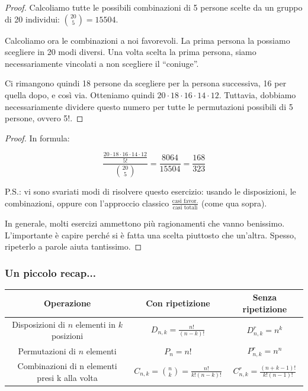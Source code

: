 \documentclass{beamer}
\begin{document}
\begin{frame}

    \begin{proof}\renewcommand{\qedsymbol}{$\longrightarrow$}
	Calcoliamo tutte le possibili combinazioni di 5 persone scelte da un gruppo di 20 individui: $\binom{20}{5} = 15504$.
	
	\medskip
	
	Calcoliamo ora le combinazioni a noi favorevoli. La prima persona la possiamo scegliere in 20 modi diversi. Una volta scelta la prima persona, siamo necessariamente vincolati a non scegliere il ``coniuge''.
	
	\medskip
	
	Ci rimangono quindi 18 persone da scegliere per la persona successiva, 16 per quella dopo, e così via. Otteniamo quindi $20 \cdot 18 \cdot 16 \cdot 14 \cdot 12$. Tuttavia, dobbiamo necessariamente dividere questo numero per tutte le permutazioni possibili di 5 persone, ovvero 5!.
	\end{proof}
\end{frame}

\begin{frame}

    \begin{proof}
	
	In formula:
	
	\[
		\frac{\frac{20 \cdot 18 \cdot 16 \cdot 14 \cdot 12}{5!}}{\binom{20}{5}} =  \frac{8064}{15504} = \frac{168}{323}
	\]
	
	\medskip
	P.S.: vi sono svariati modi di risolvere questo esercizio: usando le disposizioni, le combinazioni, oppure con l'approccio classico $ \frac{\text{casi favor.}}{\text{casi totali}}$ (come qua sopra).
	
	In generale, molti esercizi ammettono più ragionamenti che vanno benissimo. L'importante è capire perché si è fatta una scelta piuttosto che un'altra. Spesso, ripeterlo a parole aiuta tantissimo.
\end{proof}

\end{frame}

\begin{frame}[fragile]
    \frametitle{Un piccolo recap...}
    
    \begin{tabular}{|ccc|}
    \hline
    Operazione & Con ripetizione & Senza ripetizione \\ \hline
    \makecell{Disposizioni di\\$n$ elementi\\in $k$ posizioni} & $D_{n,k} = \frac{n!}{(n-k)!}$ & $D^r_{n,k} = n^k$ \\ 
    Permutazioni di $n$ elementi &  $P_n = n!$ & $P^r_{n,k} = n^n$ \\
    \makecell{Combinazioni di n elementi\\presi k alla volta} & $C_{n,k} = \binom{n}{k} = \frac{n!}{k!(n-k)!}$ & $C^r_{n,k} = \frac{(n+k-1)!}{k!(n-1)!}$ \\ \hline
    \end{tabular}

    
\end{frame}

\end{document}
